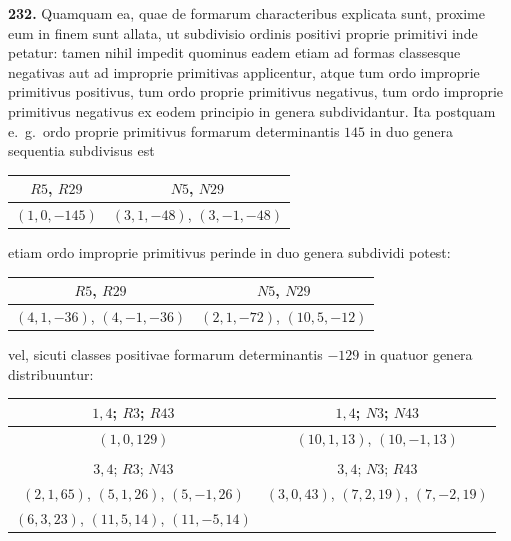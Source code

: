 \documentclass[12pt,a4paper]{article}
\theoremstyle{plain}
\theoremstyle{definition}
\theoremstyle{remark}
\begin{document}
\textbf{232.}
Quamquam ea, quae de formarum characteribus explicata sunt, proxime eum in finem sunt allata, ut subdivisio ordinis positivi proprie primitivi inde petatur: tamen nihil impedit quominus eadem etiam ad formas classesque negativas aut ad improprie primitivas applicentur, atque tum ordo improprie primitivus positivus, tum ordo proprie primitivus negativus, tum ordo improprie primitivus negativus ex eodem principio in genera subdividantur. Ita postquam e.\ g.\ ordo proprie primitivus formarum determinantis $145$ in duo genera sequentia subdivisus est
\begin{center}
\begin{tabular}{c|c}
$R5$, $R29$ & $N5$, $N29$ \\
\hline
$(1,0,-145)$ & $(3,1,-48)$, $(3,-1,-48)$
\end{tabular}
\end{center}
etiam ordo improprie primitivus perinde in duo genera subdividi potest:
\begin{center}
\begin{tabular}{c|c}
$R5$, $R29$ & $N5$, $N29$ \\
\hline
$(4,1,-36)$, $(4,-1,-36)$ & $(2,1,-72)$, $(10,5,-12)$
\end{tabular}
\end{center}
vel, sicuti classes positivae formarum determinantis $-129$ in quatuor genera distribuuntur:
\begin{center}
\begin{tabular}{c|c}
$1,4$; $R3$; $R43$ & $1,4$; $N3$; $N43$ \\
\hline
$(1,0,129)$ & $(10,1,13)$, $(10,-1,13)$ \\
& \\
$3,4$; $R3$; $N43$ & $3,4$; $N3$; $R43$ \\
\hline
$(2,1,65)$, $(5,1,26)$, $(5,-1,26)$ & $(3,0,43)$, $(7,2,19)$, $(7,-2,19)$ \\
$(6,3,23)$, $(11,5,14)$, $(11,-5,14)$ &
\end{tabular}
\end{center}
\end{document}
